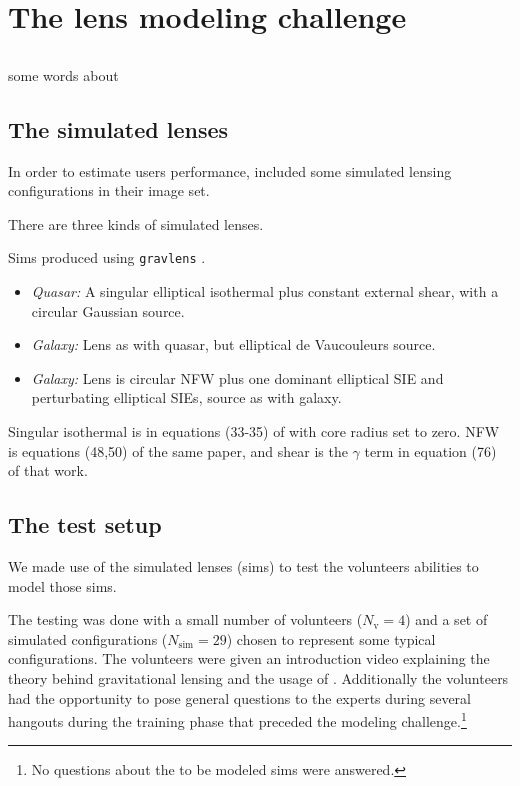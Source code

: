 \section{The lens modeling challenge} \label{sec:results}

\subsection{\sw} \label{sec:SpaceWarps}
some words about \sw

\subsection{The simulated lenses} \label{sec:sims}

In order to estimate users performance, \sw included some simulated lensing configurations in their image set.

There are three kinds of simulated lenses.

Sims produced using {\tt gravlens}
\citep{2001astro.ph..2341K,2001astro.ph..2340K}.

\begin{itemize}
  \item {\em Quasar:\/} A singular elliptical isothermal plus constant
    external shear, with a circular Gaussian source.
  \item {\em Galaxy:\/} Lens as with quasar, but elliptical de
    Vaucouleurs source.
  \item {\em Galaxy:\/} Lens is circular NFW plus one dominant
    elliptical SIE and perturbating elliptical SIEs, source as with
    galaxy.
\end{itemize}

Singular isothermal is in equations (33-35) of
\cite{2001astro.ph..2341K} with core radius set to zero. NFW is
equations (48,50) of the same paper, and shear is the $\gamma$ term in
equation (76) of that work.





\subsection{The test setup} \label{sec:testsetup}

We made use of the simulated lenses (sims) to test the volunteers abilities to model those sims.

The testing was done with a small number of volunteers ($N_\text{v}=4$) and a set of simulated configurations ($N_\text{sim}=29$) chosen to represent some typical configurations.
The volunteers were given an introduction video explaining the theory behind gravitational lensing and the usage of \spl.
Additionally the volunteers had the opportunity to pose general questions to the experts during several hangouts during the training phase that preceded the modeling challenge.\footnote{No questions about the to be modeled sims were answered.}

